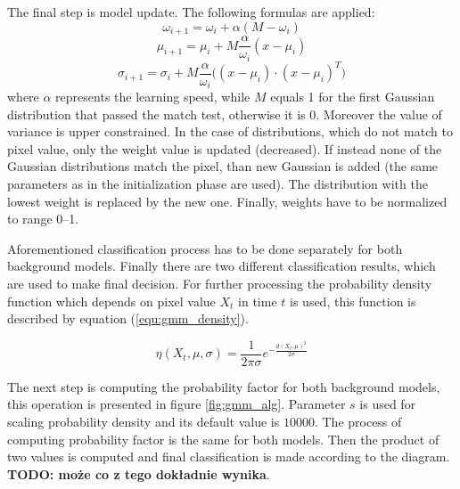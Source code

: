 \documentclass[b5paper,10pt,twoside]{article}
\begin{document}
{The final step is model update. 
The following formulas are applied:
\begin{equation}
\label{equ:w_update}
\omega_{i+1} = \omega_{i} + \alpha(M-\omega_i)
\end{equation}
\begin{equation}
\label{equ:u_update}
\mu_{i+1} = \mu_{i} + M\frac{\alpha}{\omega_i} (x-\mu_i)
\end{equation}
\begin{equation}
\label{equ:s_update}
\sigma_{i+1} = \sigma_{i} + M\frac{\alpha}{\omega_i}\Big( (x-\mu_i) \cdot (x-\mu_i)^T \Big)
\end{equation}
\noindent where $\alpha$ represents the learning speed, while $M$ equals 1 for the first Gaussian distribution that passed the match test, otherwise it is 0. 
Moreover the value of variance is upper constrained. 
In the case of distributions, which do not match to pixel value, only the weight value is updated (decreased). 
If instead none of the Gaussian distributions match the pixel, than new Gaussian is added (the same parameters as in the initialization phase are used). 
The distribution with the lowest weight is replaced by the new one. 
Finally, weights have to be normalized to range 0--1. 

Aforementioned classification process has to be done separately for both background models. Finally there are two different classification results, which are used to make final decision. For further processing the probability density function which depends on pixel value $X_t$ in time $t$ is used, this function is described by equation (\ref{equ:gmm_density}).


    \begin{equation}
        \eta (X_t, \mu, \sigma) = \frac{1}{2\pi\sigma} e^{-\frac{d(X_t, \mu)^2}{2\sigma}} 
    \label{equ:gmm_density}
    \end{equation}

The next step is computing the probability factor for both background models, this operation is presented in figure \ref{fig:gmm_alg}. Parameter $s$ is used for scaling probability density and its default value is $10000$. The process of computing probability factor is the same for both models. Then the product of two values is computed and final classification is made according to the diagram. \textbf{TODO: może co z tego dokładnie wynika}. 

}
\end{document}
